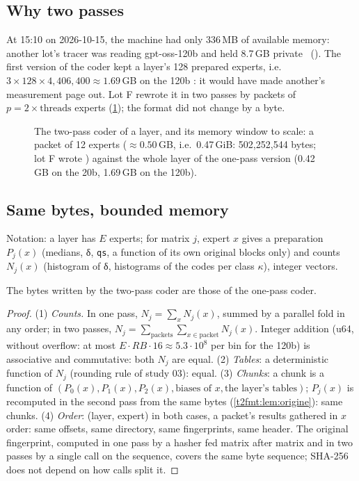 \subsection{Why two passes}

At 15:10 on 2026-10-15, the machine had only 336\,MB of available memory: another lot's tracer was reading gpt-oss-120b and held 8.7\,GB private \mes~(). The first version of the coder kept a layer's 128 prepared experts, i.e.\ $3 \times 128 \times 4{,}406{,}400 \approx 1.69$\,GB on the 120b \calc: it would have made another's measurement page out. Lot F rewrote it in two passes by packets of $p = 2 \times \text{threads}$ experts (\cref{t2fmt:fig:codeur}); the format did not change by a byte.

\begin{figure}[ht]
\centering
\TdFmtCodeur
\caption[The two-pass coder and its window]{The two-pass coder of a layer, and its memory window to scale: a packet of 12 experts ($\approx 0.50$\,GB, i.e.\ 0.47\,GiB: 502{,}252{,}544 bytes; lot F wrote ) against the whole layer of the one-pass version (0.42\,GB on the 20b, 1.69\,GB on the 120b).}
\label{t2fmt:fig:codeur}
\end{figure}

\subsection{Same bytes, bounded memory}

Notation: a layer has $E$ experts; for matrix $j$, expert $x$ gives a preparation $P_j(x)$ (medians, δ, \texttt{qs}, a function of its own original blocks only) and counts $N_j(x)$ (histogram of δ, histograms of the codes per class $\kappa$), integer vectors.

\begin{proposition}\label{t2fmt:prop:identite}
The bytes written by the two-pass coder are those of the one-pass coder.
\end{proposition}
\begin{proof}
(1) \emph{Counts.} In one pass, $N_j = \sum_x N_j(x)$, summed by a parallel fold in any order; in two passes, $N_j = \sum_{\text{packets}} \sum_{x \in \text{packet}} N_j(x)$. Integer addition (u64, without overflow: at most $E \cdot RB \cdot 16 \approx 5.3\cdot10^8$ per bin for the 120b) is associative and commutative: both $N_j$ are equal. (2) \emph{Tables}: a deterministic function of $N_j$ (rounding rule of study 03): equal. (3) \emph{Chunks}: a chunk is a function of $(P_0(x), P_1(x), P_2(x), \text{biases of } x, \text{the layer's tables})$; $P_j(x)$ is recomputed in the second pass from the same bytes (\cref{t2fmt:lem:origine}): same chunks. (4) \emph{Order}: (layer, expert) in both cases, a packet's results gathered in $x$ order: same offsets, same directory, same fingerprints, same header. The original fingerprint, computed in one pass by a hasher fed matrix after matrix and in two passes by a single call on the sequence, covers the same byte sequence; SHA-256 does not depend on how calls split it.
\end{proof}

